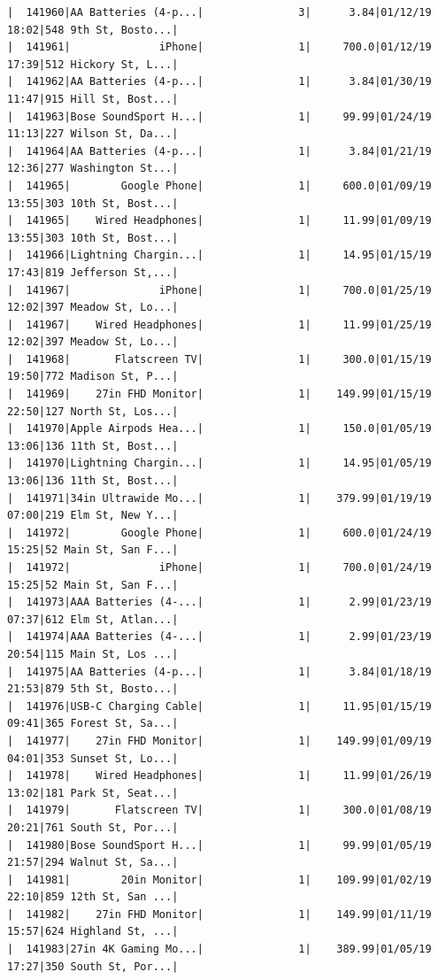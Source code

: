 \documentclass[
  letterpaper,
  DIV=11,
  numbers=noendperiod]{scrartcl}
\begin{document}
\begin{verbatim}
|  141960|AA Batteries (4-p...|               3|      3.84|01/12/19 18:02|548 9th St, Bosto...|
|  141961|              iPhone|               1|     700.0|01/12/19 17:39|512 Hickory St, L...|
|  141962|AA Batteries (4-p...|               1|      3.84|01/30/19 11:47|915 Hill St, Bost...|
|  141963|Bose SoundSport H...|               1|     99.99|01/24/19 11:13|227 Wilson St, Da...|
|  141964|AA Batteries (4-p...|               1|      3.84|01/21/19 12:36|277 Washington St...|
|  141965|        Google Phone|               1|     600.0|01/09/19 13:55|303 10th St, Bost...|
|  141965|    Wired Headphones|               1|     11.99|01/09/19 13:55|303 10th St, Bost...|
|  141966|Lightning Chargin...|               1|     14.95|01/15/19 17:43|819 Jefferson St,...|
|  141967|              iPhone|               1|     700.0|01/25/19 12:02|397 Meadow St, Lo...|
|  141967|    Wired Headphones|               1|     11.99|01/25/19 12:02|397 Meadow St, Lo...|
|  141968|       Flatscreen TV|               1|     300.0|01/15/19 19:50|772 Madison St, P...|
|  141969|    27in FHD Monitor|               1|    149.99|01/15/19 22:50|127 North St, Los...|
|  141970|Apple Airpods Hea...|               1|     150.0|01/05/19 13:06|136 11th St, Bost...|
|  141970|Lightning Chargin...|               1|     14.95|01/05/19 13:06|136 11th St, Bost...|
|  141971|34in Ultrawide Mo...|               1|    379.99|01/19/19 07:00|219 Elm St, New Y...|
|  141972|        Google Phone|               1|     600.0|01/24/19 15:25|52 Main St, San F...|
|  141972|              iPhone|               1|     700.0|01/24/19 15:25|52 Main St, San F...|
|  141973|AAA Batteries (4-...|               1|      2.99|01/23/19 07:37|612 Elm St, Atlan...|
|  141974|AAA Batteries (4-...|               1|      2.99|01/23/19 20:54|115 Main St, Los ...|
|  141975|AA Batteries (4-p...|               1|      3.84|01/18/19 21:53|879 5th St, Bosto...|
|  141976|USB-C Charging Cable|               1|     11.95|01/15/19 09:41|365 Forest St, Sa...|
|  141977|    27in FHD Monitor|               1|    149.99|01/09/19 04:01|353 Sunset St, Lo...|
|  141978|    Wired Headphones|               1|     11.99|01/26/19 13:02|181 Park St, Seat...|
|  141979|       Flatscreen TV|               1|     300.0|01/08/19 20:21|761 South St, Por...|
|  141980|Bose SoundSport H...|               1|     99.99|01/05/19 21:57|294 Walnut St, Sa...|
|  141981|        20in Monitor|               1|    109.99|01/02/19 22:10|859 12th St, San ...|
|  141982|    27in FHD Monitor|               1|    149.99|01/11/19 15:57|624 Highland St, ...|
|  141983|27in 4K Gaming Mo...|               1|    389.99|01/05/19 17:27|350 South St, Por...|

\end{verbatim}
\end{document}
